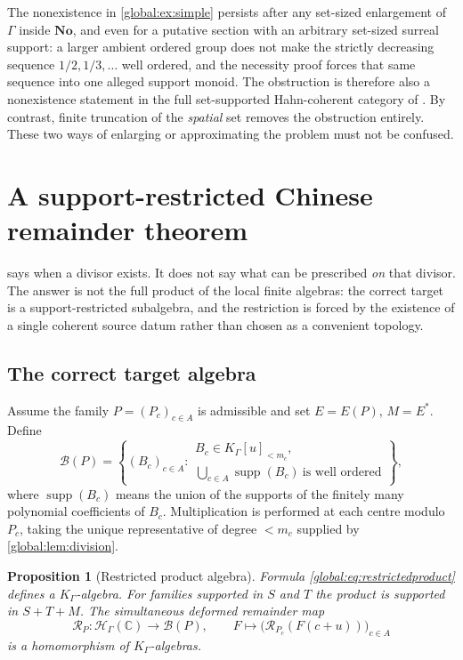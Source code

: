 \documentclass[11pt,letterpaper]{article}
\newtheorem{proposition}[proposition]{Proposition}
\theoremstyle{definition}
\theoremstyle{remark}
\newcommand{\No}{\mathbf{No}}
\newcommand{\C}{\mathbb C}
\newcommand{\HH}{\mathscr H_\Gamma}
\newcommand{\KK}{K_\Gamma}
\newcommand{\supp}{\operatorname{supp}}
\newcommand{\jet}{\mathcal R}
\newcommand{\BB}{\mathscr B(P)}
\numberwithin{equation}{section}
\begin{document}
The nonexistence in \cref{global:ex:simple} persists after any set-sized enlargement of $\Gamma$ inside $\No$, and even for a putative section with an arbitrary set-sized surreal support: a larger ambient ordered group does not make the strictly decreasing sequence $1/2,1/3,\dots$ well ordered, and the necessity proof forces that same sequence into one alleged support monoid. The obstruction is therefore also a nonexistence statement in the full set-supported Hahn-coherent category of \cite{Source}. By contrast, finite truncation of the \emph{spatial} set removes the obstruction entirely. These two ways of enlarging or approximating the problem must not be confused.

\section{A support-restricted Chinese remainder theorem}\label{global:sec:crt}

 says when a divisor exists. It does not say what can be prescribed \emph{on} that divisor. The answer is not the full product of the local finite algebras: the correct target is a support-restricted subalgebra, and the restriction is forced by the existence of a single coherent source datum rather than chosen as a convenient topology.

\subsection{The correct target algebra}

Assume the family $P=(P_c)_{c\in A}$ is admissible and set $E=E(P)$, $M=E^*$. Define
\begin{equation}\label{global:eq:restrictedproduct}
  \BB=\left\{(B_c)_{c\in A}:
  \begin{array}{l}
  B_c\in\KK[u]_{<m_c},\\[2pt]
  \displaystyle\bigcup_{c\in A}\supp(B_c)\ \text{is well ordered}
  \end{array}\right\},
\end{equation}
where $\supp(B_c)$ means the union of the supports of the finitely many polynomial coefficients of $B_c$. Multiplication is performed at each centre modulo $P_c$, taking the unique representative of degree $<m_c$ supplied by \cref{global:lem:division}.

\begin{proposition}[Restricted product algebra]\label{global:prop:restrictedalgebra}
Formula \eqref{global:eq:restrictedproduct} defines a $\KK$-algebra. For families supported in $S$ and $T$ the product is supported in $S+T+M$. The simultaneous deformed remainder map
\begin{equation}\label{global:eq:globalremainder}
  \jet_P:\HH(\C)\longrightarrow\BB,
  \qquad
  F\longmapsto\bigl(\jet_{P_c}(F(c+u))\bigr)_{c\in A}
\end{equation}
is a homomorphism of $\KK$-algebras.
\end{proposition}
\end{document}
